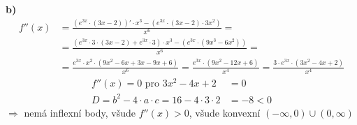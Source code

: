 \documentclass[11pt,a4paper]{article}
\begin{document}
\medskip
\textbf{b)}
\begin{align*}
f''(x) &= \frac{\left(e^{3x}\cdot(3x-2)\right)'\cdot x^3-\left(e^{3x}\cdot(3x-2)\cdot3x^2\right)}{x^6} =\\
&= \frac{\left(e^{3x}\cdot3\cdot(3x-2)+e^{3x}\cdot3\right)\cdot x^3-\left(e^{3x}\cdot\left(9x^3-6x^2\right)\right)}{x^6} =\\
&= \frac{e^{3x}\cdot x^2\cdot\left(9x^2-6x+3x-9x+6\right)}{x^6} = \frac{e^{3x}\cdot\left(9x^2-12x+6\right)}{x^4}
= \frac{3\cdot e^{3x}\cdot\left(3x^2-4x+2\right)}{x^4}
\end{align*}
\begin{align*}
f''(x)=0 \text{ pro } 3x^2-4x+2&=0\\
D=b^2-4\cdot a\cdot c=16-4\cdot3\cdot2&=-8<0
\end{align*}
$\Rightarrow$ nemá inflexní body, všude $f''(x)>0$, všude konvexní $(-\infty,0)\cup(0,\infty)$
\end{document}
